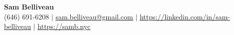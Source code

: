 \begin{center}
    \textbf{\Huge Sam Belliveau} \\ \vspace{1pt}
    \small (646) 691-6208 $|$ 
    \href{mailto:sam.belliveau@gmail.com}{\underline{sam.belliveau@gmail.com}} $|$ 
    \href{https://www.linkedin.com/in/sam-belliveau}{\underline{https://linkedin.com/in/sam-belliveau}} $|$
    \href{https://samb.nyc}{\underline{https://samb.nyc}}
\end{center}